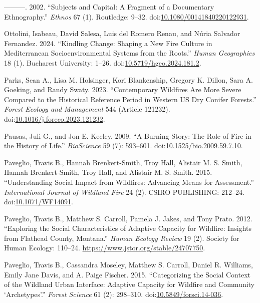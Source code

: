 \documentclass[
]{article}
\newlength{\cslhangindent}
\newenvironment{CSLReferences}[2] %
 {\begin{list}{}{%
  \setlength{\itemindent}{0pt}
  \setlength{\leftmargin}{0pt}
  \setlength{\parsep}{0pt}
  \ifodd #1
   \setlength{\leftmargin}{\cslhangindent}
   \setlength{\itemindent}{-1\cslhangindent}
  \fi
  \setlength{\itemsep}{#2\baselineskip}}}
 {\end{list}}
\begin{document}
\begin{CSLReferences}{1}{0}
---------. 2002. {``Subjects and {Capital}: {A Fragment} of a {Documentary Ethnography}.''} \emph{Ethnos} 67 (1). Routledge: 9--32. doi:\href{https://doi.org/10.1080/00141840220122931}{10.1080/00141840220122931}.

Ottolini, Isabeau, David Salesa, Luis del Romero Renau, and Núria Salvador Fernandez. 2024. {``Kindling Change: Shaping a {New Fire Culture} in {Mediterranean} Socioenvironmental Systems from the Roots.''} \emph{Human Geographies} 18 (1). Bucharest University: 1--26. doi:\href{https://doi.org/10.5719/hgeo.2024.181.2}{10.5719/hgeo.2024.181.2}.

Parks, Sean A., Lisa M. Holsinger, Kori Blankenship, Gregory K. Dillon, Sara A. Goeking, and Randy Swaty. 2023. {``Contemporary Wildfires Are More Severe Compared to the Historical Reference Period in Western {US} Dry Conifer Forests.''} \emph{Forest Ecology and Management} 544 (Article 121232). doi:\href{https://doi.org/10.1016/j.foreco.2023.121232}{10.1016/j.foreco.2023.121232}.

Pausas, Juli G., and Jon E. Keeley. 2009. {``A {Burning Story}: {The Role} of {Fire} in the {History} of {Life}.''} \emph{BioScience} 59 (7): 593--601. doi:\href{https://doi.org/10.1525/bio.2009.59.7.10}{10.1525/bio.2009.59.7.10}.

Paveglio, Travis B., Hannah Brenkert-Smith, Troy Hall, Alistair M. S. Smith, Hannah Brenkert-Smith, Troy Hall, and Alistair M. S. Smith. 2015. {``Understanding Social Impact from Wildfires: Advancing Means for Assessment.''} \emph{International Journal of Wildland Fire} 24 (2). CSIRO PUBLISHING: 212--24. doi:\href{https://doi.org/10.1071/WF14091}{10.1071/WF14091}.

Paveglio, Travis B., Matthew S. Carroll, Pamela J. Jakes, and Tony Prato. 2012. {``Exploring the {Social Characteristics} of {Adaptive Capacity} for {Wildfire}: {Insights} from {Flathead County}, {Montana}.''} \emph{Human Ecology Review} 19 (2). Society for Human Ecology: 110--24. \url{https://www.jstor.org/stable/24707750}.

Paveglio, Travis B., Cassandra Moseley, Matthew S. Carroll, Daniel R. Williams, Emily Jane Davis, and A. Paige Fischer. 2015. {``Categorizing the {Social Context} of the {Wildland Urban Interface}: {Adaptive Capacity} for {Wildfire} and {Community} {`{Archetypes}'}.''} \emph{Forest Science} 61 (2): 298--310. doi:\href{https://doi.org/10.5849/forsci.14-036}{10.5849/forsci.14-036}.


\end{CSLReferences}
\end{document}
